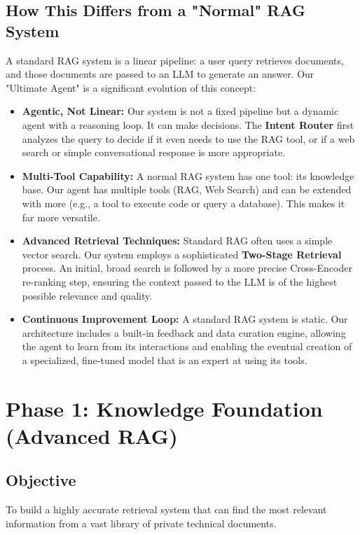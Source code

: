 \documentclass[11pt, a4paper]{article}
\begin{document}
\subsection{How This Differs from a "Normal" RAG System}
A standard RAG system is a linear pipeline: a user query retrieves documents, and those documents are passed to an LLM to generate an answer. Our "Ultimate Agent" is a significant evolution of this concept:
\begin{itemize}
    \item \textbf{Agentic, Not Linear:} Our system is not a fixed pipeline but a dynamic agent with a reasoning loop. It can make decisions. The \textbf{Intent Router} first analyzes the query to decide if it even needs to use the RAG tool, or if a web search or simple conversational response is more appropriate.
    \item \textbf{Multi-Tool Capability:} A normal RAG system has one tool: its knowledge base. Our agent has multiple tools (RAG, Web Search) and can be extended with more (e.g., a tool to execute code or query a database). This makes it far more versatile.
    \item \textbf{Advanced Retrieval Techniques:} Standard RAG often uses a simple vector search. Our system employs a sophisticated \textbf{Two-Stage Retrieval} process. An initial, broad search is followed by a more precise Cross-Encoder re-ranking step, ensuring the context passed to the LLM is of the highest possible relevance and quality.
    \item \textbf{Continuous Improvement Loop:} A standard RAG system is static. Our architecture includes a built-in feedback and data curation engine, allowing the agent to learn from its interactions and enabling the eventual creation of a specialized, fine-tuned model that is an expert at using its tools.
\end{itemize}

\section{Phase 1: Knowledge Foundation (Advanced RAG)}
\subsection{Objective}
To build a highly accurate retrieval system that can find the most relevant information from a vast library of private technical documents.
\end{document}
